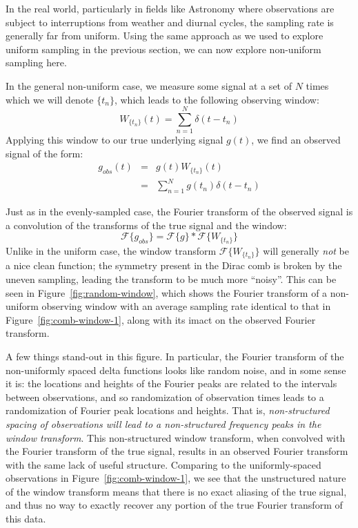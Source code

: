 \documentclass[preprint]{aastex}
\newcommand{\fig}[1]{Figure~\ref{fig:#1}}
\newcommand{\eqlabel}[1]{\label{eq:#1}}
\begin{document}
In the real world, particularly in fields like Astronomy where observations are
subject to interruptions from weather and diurnal cycles, the sampling rate
is generally far from uniform.
Using the same approach as we used to explore uniform sampling in the previous
section, we can now explore non-uniform sampling here.

In the general non-uniform case, we measure some signal at a set of $N$ times
which we will denote $\{t_n\}$, which leads to the following observing window:
\begin{equation}
  W_{\{t_n\}}(t) = \sum_{n=1}^{N} \delta(t - t_n)
  \eqlabel{nonuniform-window}
\end{equation}
Applying this window to our true underlying signal $g(t)$, we find an observed
signal of the form:
\begin{eqnarray}
  g_{obs}(t) &=& g(t) W_{\{t_n\}}(t) \nonumber\\
             &=& \sum_{n=1}^{N} g(t_n)\delta(t - t_n)
  \eqlabel{g-nonuniform}
\end{eqnarray}

Just as in the evenly-sampled case, the Fourier transform of the observed
signal is a convolution of the transforms of the true signal and the window:
\begin{equation}
  \mathcal{F}\{g_{obs}\} = \mathcal{F}\{g\} \ast \mathcal{F}\{W_{\{t_n\}}\}
  \eqlabel{g-obs-conv}
\end{equation}
Unlike in the uniform case, the window transform $\mathcal{F}\{W_{\{t_n\}}\}$
will generally {\it not} be a nice clean function; the symmetry present in
the Dirac comb is broken by the uneven sampling,
leading the transform to be much more ``noisy''.
This can be seen in \fig{random-window}, which shows the Fourier transform of
a non-uniform observing window with an average sampling rate identical to
that in \fig{comb-window-1}, along with its imact on the observed Fourier
transform.

A few things stand-out in this figure. In particular, the Fourier transform of
the non-uniformly spaced delta functions looks like random noise, and in some
sense it is: the locations and heights of the Fourier peaks are related to
the intervals between observations, and so randomization of observation times
leads to a randomization of Fourier peak locations and heights.
That is, {\it non-structured spacing of observations will lead to
a non-structured frequency peaks in the window transform}.
This non-structured window transform, when convolved with the Fourier transform
of the true signal, results in an observed Fourier transform with the same
lack of useful structure.
Comparing to the uniformly-spaced observations in \fig{comb-window-1}, we
see that the unstructured nature of the window transform means that there
is no exact aliasing of the true signal, and thus no way to exactly recover
any portion of the true Fourier transform of this data.
\end{document}

